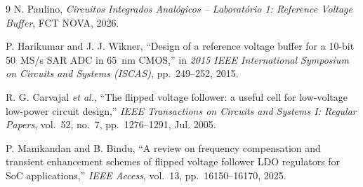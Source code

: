 \clearpage
{}

\begin{thebibliography}{9}
     N. Paulino, \textit{Circuitos Integrados Analógicos -- Laboratório 1: Reference Voltage Buffer}, FCT NOVA, 2026.

     P. Harikumar and J. J. Wikner, ``Design of a reference voltage buffer for a 10-bit 50~MS/s SAR ADC in 65~nm CMOS,'' in \textit{2015 IEEE International Symposium on Circuits and Systems (ISCAS)}, pp.~249--252, 2015.

     R. G. Carvajal \textit{et al.}, ``The flipped voltage follower: a useful cell for low-voltage low-power circuit design,'' \textit{IEEE Transactions on Circuits and Systems I: Regular Papers}, vol.~52, no.~7, pp.~1276--1291, Jul. 2005.

     P. Manikandan and B. Bindu, ``A review on frequency compensation and transient enhancement schemes of flipped voltage follower LDO regulators for SoC applications,'' \textit{IEEE Access}, vol.~13, pp.~16150--16170, 2025.    

\end{thebibliography}